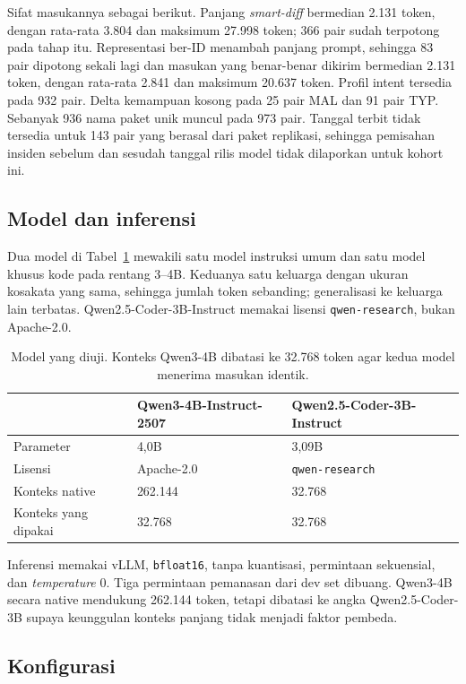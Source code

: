 \documentclass[a4paper,fleqn]{cas-dc}
\begin{document}
Sifat masukannya sebagai berikut. Panjang \emph{smart-diff} bermedian 2.131
token, dengan rata-rata 3.804 dan maksimum 27.998 token; 366 pair sudah
terpotong pada tahap itu. Representasi ber-ID menambah panjang prompt,
sehingga 83 pair dipotong sekali lagi dan masukan yang benar-benar dikirim
bermedian 2.131 token, dengan rata-rata 2.841 dan maksimum 20.637 token.
Profil intent tersedia pada 932 pair.
Delta kemampuan kosong pada 25 pair MAL dan 91 pair TYP. Sebanyak 936 nama
paket unik muncul pada 973 pair. Tanggal terbit tidak tersedia untuk 143 pair
yang berasal dari paket replikasi, sehingga pemisahan insiden sebelum dan
sesudah tanggal rilis model tidak dilaporkan untuk kohort ini.

\subsection{Model dan inferensi}\label{sec:models}

Dua model di Tabel~\ref{tab:models} mewakili satu model instruksi umum dan
satu model khusus kode pada rentang 3--4B. Keduanya
satu keluarga dengan ukuran kosakata yang sama, sehingga jumlah token
sebanding; generalisasi ke keluarga lain terbatas. Qwen2.5-Coder-3B-Instruct
memakai lisensi \texttt{qwen-research}, bukan Apache-2.0.

\begin{table}[t]
\caption{Model yang diuji. Konteks Qwen3-4B dibatasi ke 32.768 token agar
kedua model menerima masukan identik.}
\label{tab:models}
\small
\begin{tabular}{p{2.4cm} p{2.6cm} p{2.6cm}}
\hline
  & Qwen3-4B-Instruct-2507 & Qwen2.5-Coder-3B-Instruct \\
\hline
Parameter & 4,0B & 3,09B \\
Lisensi & Apache-2.0 & \texttt{qwen-research} \\
Konteks native & 262.144 & 32.768 \\
Konteks yang dipakai & 32.768 & 32.768 \\
\hline
\end{tabular}
\end{table}

Inferensi memakai vLLM, \texttt{bfloat16}, tanpa kuantisasi, permintaan
sekuensial, dan \emph{temperature} 0. Tiga permintaan pemanasan dari dev set
dibuang. Qwen3-4B secara native mendukung 262.144 token, tetapi dibatasi ke
angka Qwen2.5-Coder-3B supaya keunggulan konteks panjang tidak menjadi faktor
pembeda.

\subsection{Konfigurasi}\label{sec:configs}
\end{document}
